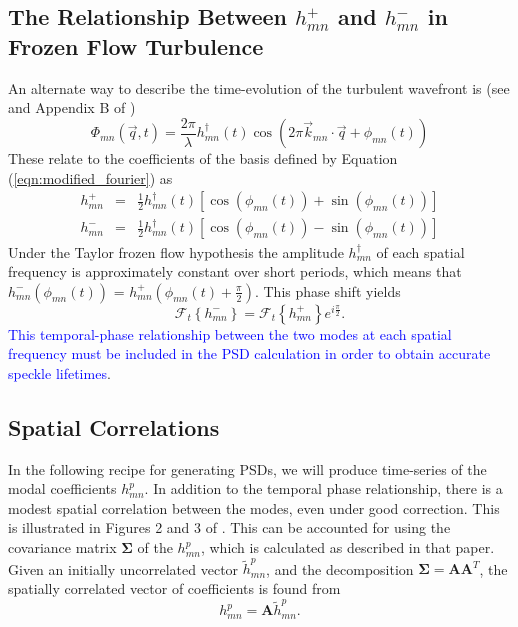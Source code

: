 \documentclass[10pt,preprint]{aastex631}
\newcommand{\jrmadd}[1]{\textcolor{blue}{#1}}
\begin{document}
\subsection{The Relationship Between $h_{mn}^+$ and $h_{mn}^-$ in Frozen Flow Turbulence}

An alternate way to describe the time-evolution of the turbulent wavefront is (see \citet{2005ApJ...629..592G} and Appendix B of \citet{2018JATIS...4a9001M})
\begin{equation}
\Phi_{mn}(\vec{q},t) = \frac{2\pi}{\lambda} h_{mn}^\dagger(t) \cos \left( 2\pi \vec{k}_{mn} \cdot \vec{q} + \phi_{mn}(t) \right)
\end{equation}
These relate to the coefficients of the basis defined by Equation (\ref{eqn:modified_fourier}) as
\begin{eqnarray}
h_{mn}^+ &=& \frac{1}{2} h_{mn}^\dagger(t) \left[ \cos(\phi_{mn}(t)) + \sin(\phi_{mn}(t))\right] \\
h_{mn}^- &=& \frac{1}{2} h_{mn}^\dagger(t) \left[ \cos(\phi_{mn}(t)) - \sin(\phi_{mn}(t))\right] \nonumber
\end{eqnarray}
Under the Taylor frozen flow hypothesis the amplitude $h_{mn}^\dagger$ of each spatial frequency is approximately constant over short periods, which means that $h_{mn}^-(\phi_{mn}(t))$ = $h_{mn}^+(\phi_{mn}(t) + \frac{\pi}{2})$.  This phase shift yields
\begin{equation}
\mathcal{F}_t\left\{h_{mn}^-\right\} = \mathcal{F}_t\left\{h_{mn}^+\right\} e^{i\frac{\pi}{2}}.
\end{equation}
\jrmadd{This temporal-phase relationship between the two modes at each spatial frequency must be included in the PSD calculation in order to obtain accurate speckle lifetimes}.

\subsection{Spatial Correlations}

In the following recipe for generating PSDs, we will produce time-series of the modal coefficients $h_{mn}^p$.  In addition to the temporal phase relationship, there is a modest spatial correlation between the modes, even under good correction.  This is illustrated in Figures 2 and 3 of \citet{2018JATIS...4a9001M}.  This can be accounted for using the covariance matrix $\pmb{\Sigma}$ of the $h_{mn}^p$, which is calculated as described in that paper.  Given an initially uncorrelated vector $\tilde{h}_{mn}^p$, and the decomposition $\pmb{\Sigma} = \pmb{A}\pmb{A}^T$, the spatially correlated vector of coefficients is found from
\begin{equation}
h_{mn}^p = \pmb{A} \tilde{h}_{mn}^p.
\end{equation}
\end{document}
